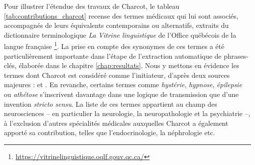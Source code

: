 Pour illustrer l'étendue des travaux de Charcot, le tableau \ref{tab:contributions_charcot} recense des termes médicaux qui lui sont associés, accompagnés de leurs équivalents contemporains ou alternatifs, extraits du dictionnaire terminologique \textit{La Vitrine linguistique} de l'Office québécois de la langue française \footnote{\url{https://vitrinelinguistique.oqlf.gouv.qc.ca/}}. La prise en compte des synonymes de ces termes a été particulièrement importante dans l'étape de l'extraction automatique de phrases-clés, élaborée dans le chapitre \ref{chap:resultats}. Nous y mettons en évidence les termes dont Charcot est considéré comme l'initiateur, d'après deux sources majeures : \citet{walusinski} et \citet{camargo2023}. En revanche, certains termes comme \textit{hystérie}, \textit{hypnose}, \textit{épilepsie} ou \textit{athétose} s'inscrivent davantage dans une logique de transmission que d'une invention \textit{stricto sensu}. La liste de ces termes appartient au champ des neurosciences -- en particulier la neurologie, la neuropathologie et la psychiatrie --, à l'exclusion d'autres spécialités médicales auxquelles Charcot a également apporté sa contribution, telles que l'endocrinologie, la néphrologie etc.

